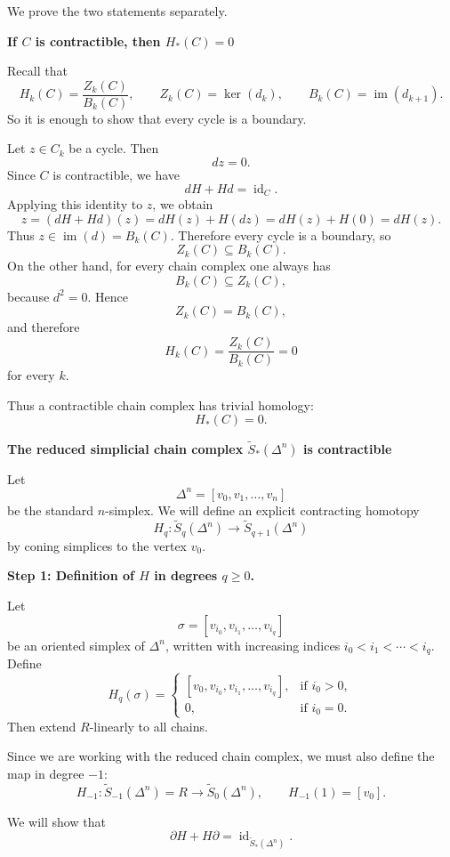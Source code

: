 \begin{solution}
We prove the two statements separately.


\medskip
\noindent\textbf{If \(C\) is contractible, then \(H_*(C)=0\)}\par
\smallskip


Recall that
\[
H_k(C)=\frac{Z_k(C)}{B_k(C)},
\qquad
Z_k(C)=\ker(d_k),
\qquad
B_k(C)=\operatorname{im}(d_{k+1}).
\]
So it is enough to show that every cycle is a boundary.

Let \(z\in C_k\) be a cycle. Then
\[
dz=0.
\]
Since \(C\) is contractible, we have
\[
dH+Hd=\operatorname{id}_C.
\]
Applying this identity to \(z\), we obtain
\[
z=(dH+Hd)(z)=dH(z)+H(dz)=dH(z)+H(0)=dH(z).
\]
Thus \(z\in \operatorname{im}(d)=B_k(C)\). Therefore every cycle is a boundary, so
\[
Z_k(C)\subseteq B_k(C).
\]
On the other hand, for every chain complex one always has
\[
B_k(C)\subseteq Z_k(C),
\]
because \(d^2=0\). Hence
\[
Z_k(C)=B_k(C),
\]
and therefore
\[
H_k(C)=\frac{Z_k(C)}{B_k(C)}=0
\]
for every \(k\).

Thus a contractible chain complex has trivial homology:
\[
H_*(C)=0.
\]


\medskip
\noindent\textbf{The reduced simplicial chain complex \(\widetilde{S}_*(\Delta^n)\) is contractible}\par
\smallskip


Let
\[
\Delta^n=[v_0,v_1,\dots,v_n]
\]
be the standard \(n\)-simplex. We will define an explicit contracting homotopy
\[
H_q : \widetilde{S}_q(\Delta^n)\to \widetilde{S}_{q+1}(\Delta^n)
\]
by coning simplices to the vertex \(v_0\).


\medskip
\noindent\textbf{Step 1: Definition of \(H\) in degrees \(q\ge 0\).}\par
\smallskip


Let
\[
\sigma=[v_{i_0},v_{i_1},\dots,v_{i_q}]
\]
be an oriented simplex of \(\Delta^n\), written with increasing indices \(i_0<i_1<\cdots<i_q\). Define
\[
H_q(\sigma)=
\begin{cases}
	[v_0,v_{i_0},v_{i_1},\dots,v_{i_q}], & \text{if } i_0>0,\\[1mm]
	0, & \text{if } i_0=0.
\end{cases}
\]
Then extend \(R\)-linearly to all chains.

Since we are working with the reduced chain complex, we must also define the map in degree \(-1\):
\[
H_{-1}: \widetilde{S}_{-1}(\Delta^n)=R \longrightarrow \widetilde{S}_0(\Delta^n),
\qquad
H_{-1}(1)=[v_0].
\]

We will show that
\[
\partial H + H\partial=\operatorname{id}_{\widetilde{S}_*(\Delta^n)}.
\]



\end{solution}
